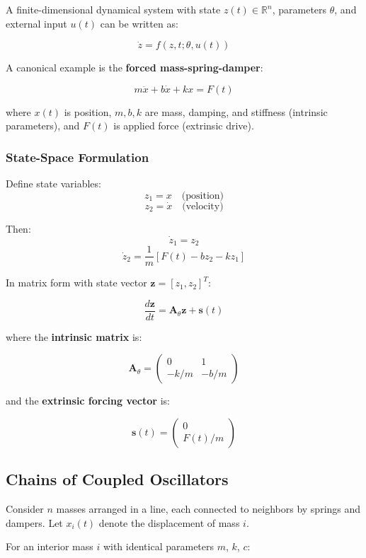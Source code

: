\documentclass[
]{article}
\begin{document}
A finite-dimensional dynamical system with state
\(z(t) \in \mathbb{R}^n\), parameters \(\theta\), and external input
\(u(t)\) can be written as:

\[\dot{z} = f(z, t; \theta, u(t))\]

A canonical example is the \textbf{forced mass-spring-damper}:

\[m\ddot{x} + b\dot{x} + kx = F(t)\]

where \(x(t)\) is position, \(m, b, k\) are mass, damping, and stiffness
(intrinsic parameters), and \(F(t)\) is applied force (extrinsic drive).

\subsubsection{State-Space Formulation}\label{state-space-formulation}

Define state variables: \[z_1 = x \quad \text{(position)}\]
\[z_2 = \dot{x} \quad \text{(velocity)}\]

Then: \[\dot{z}_1 = z_2\]
\[\dot{z}_2 = \frac{1}{m}\left[F(t) - bz_2 - kz_1\right]\]

In matrix form with state vector \(\mathbf{z} = [z_1, z_2]^T\):

\[\frac{d\mathbf{z}}{dt} = \mathbf{A}_\theta \mathbf{z} + \mathbf{s}(t)\]

where the \textbf{intrinsic matrix} is:

\[\mathbf{A}_\theta = \begin{pmatrix} 0 & 1 \\ -k/m & -b/m \end{pmatrix}\]

and the \textbf{extrinsic forcing vector} is:

\[\mathbf{s}(t) = \begin{pmatrix} 0 \\ F(t)/m \end{pmatrix}\]

\subsection{Chains of Coupled
Oscillators}\label{chains-of-coupled-oscillators}

Consider \(n\) masses arranged in a line, each connected to neighbors by
springs and dampers. Let \(x_i(t)\) denote the displacement of mass
\(i\).

For an interior mass \(i\) with identical parameters \(m\), \(k\),
\(c\):
\end{document}
